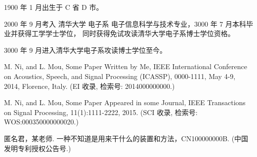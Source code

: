 \begin{resume}
  1900 年 1 月出生于 C 省 D 市。

  2000 年 9 月考入 清华大学 电子系 电子信息科学与技术专业，3000 年 7 月本科毕业并获得工学学士学位， 同时获得免试攻读清华大学电子系博士学位资格。

  3000 年 9 月进入清华大学电子系攻读博士学位至今。


  \begin{enumerate}[{[}1{]}]
  \item M. Ni, and L. Mou, Some Paper Written by Me,
  IEEE International Conference on Acoustics, Speech, and Signal Processing  (ICASSP),
  0000-1111, May 4-9, 2014, Florence, Italy. (EI 收录, 检索号: 2014000000000.)
  \item M. Ni, and L. Mou, Some Paper Appeared in some Journal, IEEE Transactions on Signal Processing, 11(1):1111-2222, 2015.
   (SCI 收录, 检索号: WOS:000350000000020.)
  \end{enumerate}


  \begin{enumerate}[{[}1{]}]
  \item 匿名君，某老师. 一种不知道是用来干什么的装置和方法，CN100000000B. (中国发明专利授权公告号.)
  \end{enumerate}

\end{resume}
